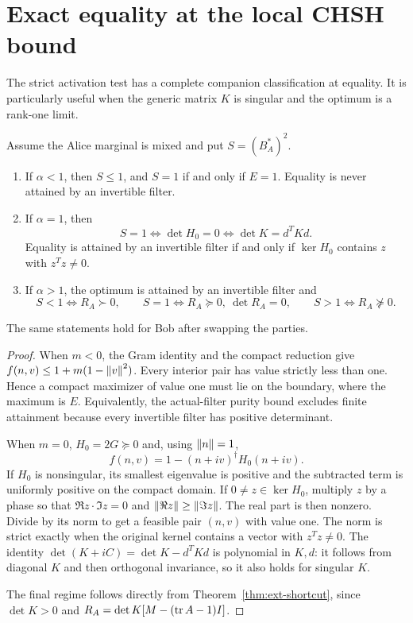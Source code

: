 \section{Exact equality at the local CHSH bound}
\label{sec:ext-threshold}

The strict activation test has a complete companion classification at
equality. It is particularly useful when the generic matrix $K$ is
singular and the optimum is a rank-one limit.

\begin{theorem}[Three regimes at \(B_A^*=1\)]
\label{thm:ext-threshold}
Assume the Alice marginal is mixed and put $S=(B_A^*)^2$.
\begin{enumerate}[label=(\roman*)]
\item If $\alpha<1$, then $S\le1$, and
      $S=1$ if and only if $E=1$. Equality is never attained by an
      invertible filter.
\item If $\alpha=1$, then
      \[
       S=1\iff\det H_0=0
          \iff\det K=d^TKd.
      \]
      Equality is attained by an invertible filter if and only if
      $\ker H_0$ contains $z$ with $z^Tz\ne0$.
\item If $\alpha>1$, the optimum is attained by an invertible filter and
      \[
       S<1\iff R_A\succ0,\qquad
       S=1\iff R_A\succeq0,\ \det R_A=0,\qquad
       S>1\iff R_A\not\succeq0.
      \]
\end{enumerate}
The same statements hold for Bob after swapping the parties.
\end{theorem}

\begin{proof}
When $m<0$, the Gram identity and the compact reduction give
$f(n,v)\le1+m(1-\left\lVert v\right\rVert^2)$.
Every interior pair has value strictly less than one. Hence a compact
maximizer of value one must lie on the boundary, where the maximum is
$E$. Equivalently, the actual-filter purity bound excludes finite
attainment because every invertible filter has positive determinant.

When $m=0$, $H_0=2G\succeq0$ and, using $\left\lVert n\right\rVert=1$,
\begin{equation}
 f(n,v)=1-(n+iv)^\dagger H_0(n+iv).
 \label{eq:ext-threshold-form}
\end{equation}
If $H_0$ is nonsingular, its smallest eigenvalue is positive and the
subtracted term is uniformly positive on the compact domain.
If $0\ne z\in\ker H_0$, multiply $z$ by a phase so that
$\Re z\cdot\Im z=0$ and $\left\lVert\Re z\right\rVert\ge\left\lVert\Im z\right\rVert$.
The real part is then nonzero. Divide by its norm to get a feasible
pair $(n,v)$ with value one. The norm is strict exactly when the
original kernel contains a vector with $z^Tz\ne0$.
The identity $\det(K+iC)=\det K-d^TKd$ is polynomial in $K,d$:
it follows from diagonal $K$ and then orthogonal invariance, so it
also holds for singular $K$.

The final regime follows directly from
Theorem~\ref{thm:ext-shortcut}, since $\det K>0$ and
$R_A=\det K[M-(\operatorname{tr} A-1)I]$.
\end{proof}

